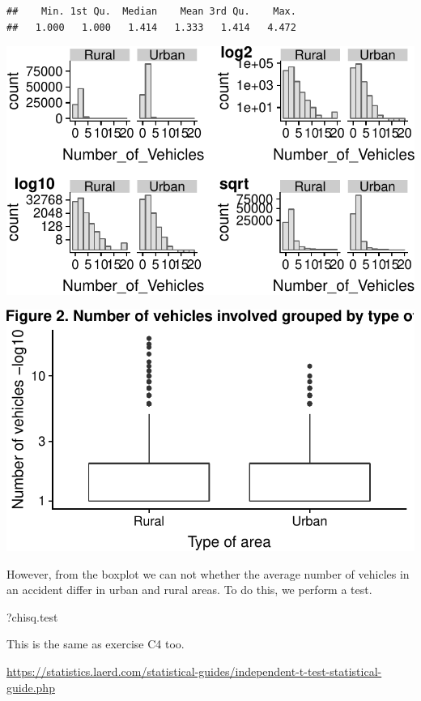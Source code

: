 \documentclass[]{article}
\begin{document}
\begin{verbatim}
##    Min. 1st Qu.  Median    Mean 3rd Qu.    Max. 
##   1.000   1.000   1.414   1.333   1.414   4.472
\end{verbatim}

\begin{center}\includegraphics{README_files/figure-latex/unnamed-chunk-7-2} \end{center}

\begin{center}\includegraphics{README_files/figure-latex/unnamed-chunk-7-3} \end{center}

However, from the boxplot we can not whether the average number of
vehicles in an accident differ in urban and rural areas. To do this, we
perform a test.

?chisq.test

This is the same as exercise C4 too.

\url{https://statistics.laerd.com/statistical-guides/independent-t-test-statistical-guide.php}
\end{document}
